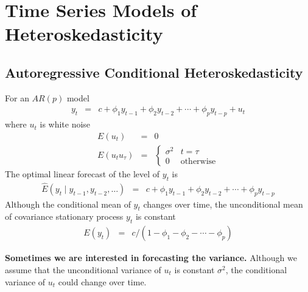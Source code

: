 \section[Time Series Models of Heteroskedasticity]{Time Series Models of Heteroskedasticity}
\subsection{Autoregressive Conditional Heteroskedasticity}
For an $AR(p)$ model
\begin{eqnarray*}
y_{t}&=&c+\phi_{1} y_{t-1}+\phi_{2} y_{t-2}+\cdots+\phi_{p} y_{t-p}+u_{t}
\end{eqnarray*}
where $u_{t}$ is white noise
\begin{eqnarray*}
E(u_{t})&=&0\\
E(u_{t}u_{\tau})&=&\begin{cases}
\sigma^{2}&t=\tau\\
0&\text{otherwise}
\end{cases}
\end{eqnarray*}
The optimal linear forecast of the level of $y_{t}$ is 
\begin{eqnarray*}
\widehat{E}(y_{t}\mid y_{t-1},y_{t-2},\dots)&=&c+\phi_{1} y_{t-1}+\phi_{2} y_{t-2}+\cdots+\phi_{p} y_{t-p}
\end{eqnarray*}
Although the conditional mean of $y_{t}$ changes over time, the unconditional mean of covariance stationary process $y_{t}$ is constant
\begin{eqnarray*}
E(y_{t})&=&c/(1-\phi_{1}-\phi_{2}-\cdots-\phi_{p})
\end{eqnarray*}

\textbf{Sometimes we are interested in forecasting the variance.}
Although we assume that the unconditional variance of $u_{t}$ is constant $\sigma^{2}$, the conditional variance of $u_{t}$ could change over time. 
